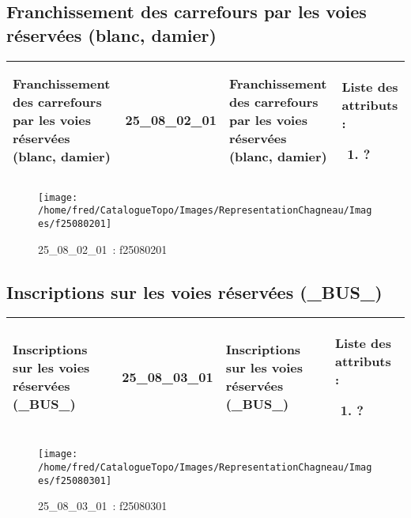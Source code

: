 \documentclass[12pt,titlepage]{book}
\begin{document}
\subsection{Franchissement des carrefours par les voies réservées (blanc, damier)}
\noindent
\vspace{\baselineskip}

\renewcommand{\arraystretch}{1.2}
\begin{supertabular}{|p{10cm}|c|p{13cm}|p{12cm}|}
 Franchissement des carrefours par les voies réservées (blanc, damier) & 25\_08\_02\_01 & Franchissement des carrefours par les voies réservées (blanc, damier) & Liste des attributs :
\begin{enumerate}
  \item ?\end{enumerate}
\\
\hline
\end{supertabular}
\begin{figure}[h!]
  \hfill         %
  \begin{minipage}[t]{3cm}
    \begin{center}
      \texttt{[image: /home/fred/CatalogueTopo/Images/RepresentationChagneau/Images/f25080201]}
      \caption[~25\_08\_02\_01]{\small{25\_08\_02\_01~:} \tiny{f25080201}}\label{f25080201}
    \end{center}
  \end{minipage}
\end{figure}


\subsection{Inscriptions sur les voies réservées (\_BUS\_)}
\noindent
\vspace{\baselineskip}

\renewcommand{\arraystretch}{1.2}
\begin{supertabular}{|p{10cm}|c|p{13cm}|p{12cm}|}
 Inscriptions sur les voies réservées (\_BUS\_) & 25\_08\_03\_01 & Inscriptions sur les voies réservées (\_BUS\_) & Liste des attributs :
\begin{enumerate}
  \item ?\end{enumerate}
\\
\hline
\end{supertabular}
\begin{figure}[h!]
  \hfill         %
  \begin{minipage}[t]{3cm}
    \begin{center}
      \texttt{[image: /home/fred/CatalogueTopo/Images/RepresentationChagneau/Images/f25080301]}
      \caption[~25\_08\_03\_01]{\small{25\_08\_03\_01~:} \tiny{f25080301}}\label{f25080301}
    \end{center}
  \end{minipage}
\end{figure}
\end{document}
